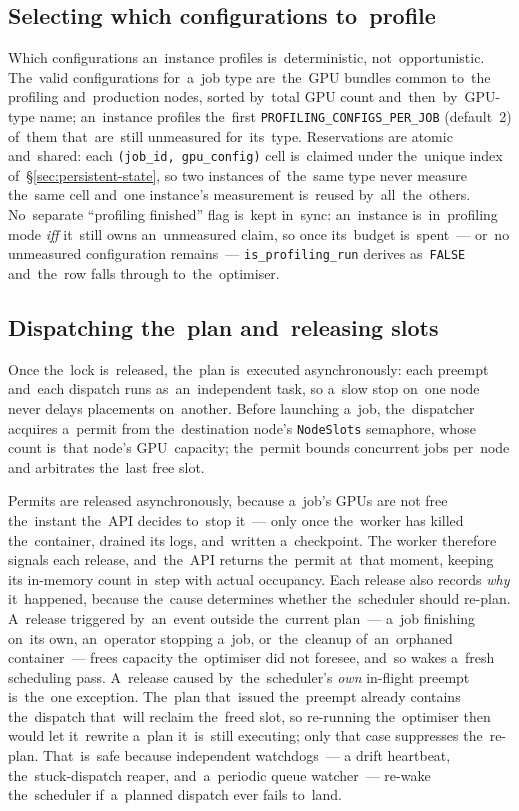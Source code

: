 \subsection{Selecting which configurations to~profile}

Which configurations an~instance profiles is~deterministic, not~opportunistic.
The~valid configurations for~a~job type are~the~GPU bundles common to~the
profiling and~production nodes, sorted by~total GPU count and~then~by~GPU-type
name; an~instance profiles the~first \texttt{PROFILING\_CONFIGS\_PER\_JOB}
(default~2) of~them that~are~still unmeasured for~its~type.  Reservations are
atomic and~shared: each \texttt{(job\_id, gpu\_config)} cell is~claimed under
the~unique index of~\S\ref{sec:persistent-state}, so two instances of~the~same
type never measure the~same cell and~one instance's measurement is~reused
by~all~the~others.  No~separate ``profiling finished'' flag is~kept in~sync:
an~instance is~in~profiling mode \emph{iff} it~still owns an~unmeasured claim,
so once its~budget is~spent~--- or~no unmeasured configuration remains~---
\texttt{is\_profiling\_run} derives as~\texttt{FALSE} and~the~row falls through
to~the~optimiser.

\subsection{Dispatching the~plan and~releasing slots}

Once the~lock is~released, the~plan is~executed asynchronously: each preempt
and~each dispatch runs as~an~independent task, so a~slow stop on~one node never
delays placements on~another.  Before launching a~job, the~dispatcher acquires
a~permit from the~destination node's \texttt{NodeSlots} semaphore, whose count
is~that node's GPU~capacity; the~permit bounds concurrent jobs per~node and
arbitrates the~last free slot.

Permits are released asynchronously, because a~job's GPUs are not free
the~instant the~API decides to~stop it~--- only once the~worker has
killed the~container, drained its logs, and~written a~checkpoint.  The
worker therefore signals each release, and~the~API returns the~permit
at~that moment, keeping its in-memory count in~step with actual
occupancy.  Each release also records \emph{why} it~happened, because
the~cause determines whether the~scheduler should re-plan.  A~release
triggered by~an~event outside the~current plan~--- a~job finishing
on~its own, an~operator stopping a~job, or~the~cleanup of~an~orphaned
container~--- frees capacity the~optimiser did not foresee, and~so wakes
a~fresh scheduling pass.  A~release caused by~the~scheduler's \emph{own}
in-flight preempt is~the~one exception.  The~plan that~issued the~preempt
already contains the~dispatch that~will reclaim the~freed slot, so re-running
the~optimiser then would let it~rewrite a~plan it~is~still executing; only that
case suppresses the~re-plan.  That~is~safe because independent watchdogs~--- a
drift heartbeat, the~stuck-dispatch reaper, and~a~periodic queue watcher~---
re-wake the~scheduler if~a~planned dispatch ever fails to~land.


